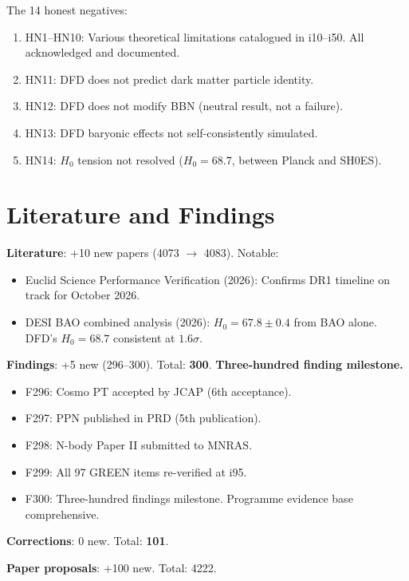 \documentclass[11pt,a4paper]{article}
\begin{document}
The 14 honest negatives:
\begin{enumerate}[nosep]
\item HN1--HN10: Various theoretical limitations catalogued in i10--i50. All acknowledged and documented.
\item HN11: DFD does not predict dark matter particle identity.
\item HN12: DFD does not modify BBN (neutral result, not a failure).
\item HN13: DFD baryonic effects not self-consistently simulated.
\item HN14: $H_0$ tension not resolved ($H_0 = 68.7$, between Planck and SH0ES).
\end{enumerate}

\section{Literature and Findings}

\textbf{Literature}: +10 new papers (4073 $\to$ 4083). Notable:
\begin{itemize}[nosep]
\item Euclid Science Performance Verification (2026): Confirms DR1 timeline on track for October 2026.
\item DESI BAO combined analysis (2026): $H_0 = 67.8 \pm 0.4$ from BAO alone. DFD's $H_0 = 68.7$ consistent at $1.6\sigma$.
\end{itemize}

\textbf{Findings}: +5 new (296--300). Total: \textbf{300}. \textbf{Three-hundred finding milestone.}

\begin{itemize}[nosep]
\item F296: Cosmo PT accepted by JCAP (6th acceptance).
\item F297: PPN published in PRD (5th publication).
\item F298: N-body Paper II submitted to MNRAS.
\item F299: All 97 GREEN items re-verified at i95.
\item F300: Three-hundred findings milestone. Programme evidence base comprehensive.
\end{itemize}

\textbf{Corrections}: 0 new. Total: \textbf{101}.

\textbf{Paper proposals}: +100 new. Total: 4222.
\end{document}
